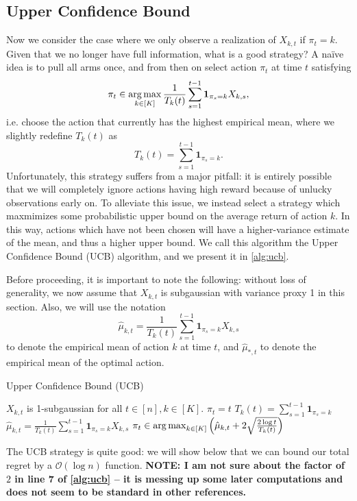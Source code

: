 \subsection{Upper Confidence Bound}
Now we consider the case where we only observe a realization of $X_{k,t}$ if $\pi_t = k$. Given that we no longer have full information, what is a good strategy? A na\"ive idea is to pull all arms once, and from then on select action $\pi_t$ at time $t$ satisfying 
\[
\pi_t \in \operatorname*{arg\,max}_{k \in [K]} \frac{1}{T_k(t)} \sum_{s=1}^{t-1}\mathbf{1}_{\pi_s = k} X_{k, s},
\] 
i.e. choose the action that currently has the highest empirical mean, where we slightly redefine $T_k(t)$ as 
\[
T_k(t) = \sum_{s=1}^{t-1} \mathbf{1}_{\pi_s = k}.
\]
Unfortunately, this strategy suffers from a major pitfall: it is entirely possible that we will completely ignore actions having high reward because of unlucky observations early on. To alleviate this issue, we instead select a strategy which maxmimizes some probabilistic upper bound on the average return of action $k$. In this way, actions which have not been chosen will have a higher-variance estimate of the mean, and thus a higher upper bound. We call this algorithm the Upper Confidence Bound (UCB) algorithm, and we present it in \autoref{alg:ucb}.

Before proceeding, it is important to note the following: without loss of generality, we now assume that $X_{k, t}$ is subgaussian with variance proxy 1 in this section. Also, we will use the notation 
\[
\hat \mu_{k, t} = \frac{1}{T_k(t)} \sum_{s=1}^{t-1}\mathbf{1}_{\pi_s = k} X_{k, s}
\]
to denote the empirical mean of action $k$ at time $t$, and $\hat \mu_{*, t}$ to denote the empirical mean of the optimal action. 

\begin{algorithm}
\caption{Upper Confidence Bound (UCB)}
   \begin{algorithmic}[1] \label{alg:ucb}
   \REQUIRE $X_{k, t}$ is 1-subgaussian for all $t \in [n], k \in [K]$. 
   	\STATE $\pi_t = t$
   \ENDFOR
   	\STATE $T_k(t) = \sum_{s=1}^{t-1} \mathbf{1}_{\pi_s = k}$
	\STATE $\hat \mu_{k, t} = \frac{1}{T_k(t)} \sum_{s=1}^{t-1}\mathbf{1}_{\pi_s = k} X_{k, s}$   	
   	\STATE $\pi_t \in \operatorname*{arg\,max}_{k \in [K]}\left(\hat \mu_{k, t} + 2 \sqrt{\frac{2 \log t}{T_k(t)}} \right)$
   \ENDFOR  
\end{algorithmic}
\end{algorithm}

The UCB strategy is quite good: we will show below that we can bound our total regret by a $\mathcal{O}(\log n)$ function. \textbf{NOTE: I am not sure about the factor of $2$ in line 7 of \autoref{alg:ucb} -- it is messing up some later computations and does not seem to be standard in other references.}

